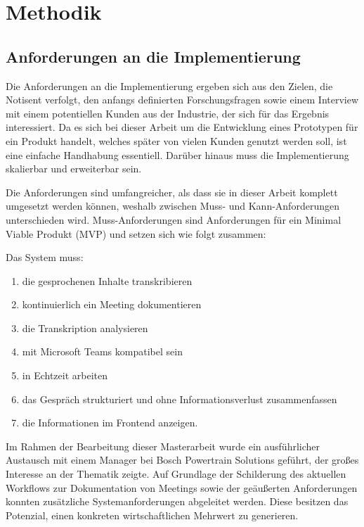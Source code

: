 \chapter{Methodik}
\section{Anforderungen an die Implementierung}
Die Anforderungen an die Implementierung ergeben sich aus den Zielen, die Notisent verfolgt, den anfangs definierten Forschungsfragen sowie einem Interview mit einem potentiellen Kunden aus der Industrie, der sich für das Ergebnis interessiert. Da es sich bei dieser Arbeit um die Entwicklung eines Prototypen für ein Produkt handelt, welches später von vielen Kunden genutzt werden soll, ist eine einfache Handhabung essentiell. Darüber hinaus muss die Implementierung skalierbar und erweiterbar sein. 

Die Anforderungen sind umfangreicher, als dass sie in dieser Arbeit komplett umgesetzt werden können, weshalb zwischen Muss- und Kann-Anforderungen unterschieden wird. 
Muss-Anforderungen sind Anforderungen für ein Minimal Viable Produkt (MVP) und setzen sich wie folgt zusammen: 

Das System muss:
\begin{enumerate}
    \item die gesprochenen Inhalte transkribieren 
    \item kontinuierlich ein Meeting dokumentieren
    \item die Transkription analysieren
    \item mit Microsoft Teams \cite{teams} kompatibel sein
    \item in Echtzeit arbeiten
    \item das Gespräch strukturiert und ohne Informationsverlust zusammenfassen
    \item die Informationen im Frontend anzeigen.
\end{enumerate}

Im Rahmen der Bearbeitung dieser Masterarbeit wurde ein ausführlicher Austausch mit einem Manager bei Bosch Powertrain Solutions geführt, der großes Interesse an der Thematik zeigte. Auf Grundlage der Schilderung des aktuellen Workflows zur Dokumentation von Meetings sowie der geäußerten Anforderungen konnten zusätzliche Systemanforderungen abgeleitet werden. Diese besitzen das Potenzial, einen konkreten wirtschaftlichen Mehrwert zu generieren.

